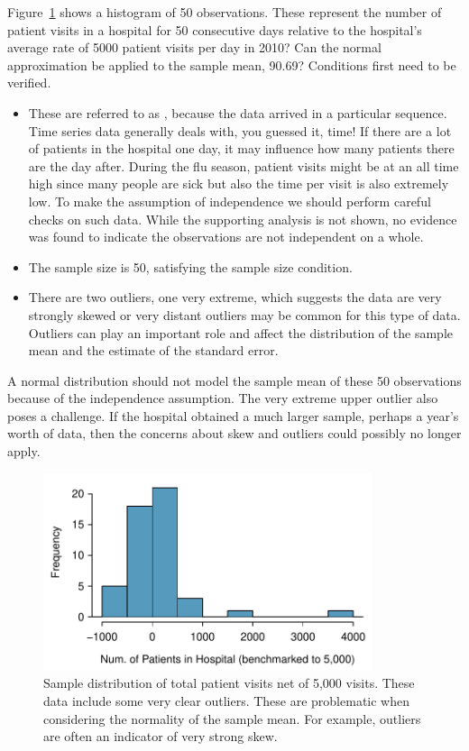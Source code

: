 \begin{example}{Figure~\ref{hospitalCanApplyNormalToSampMean} shows a histogram of 50 observations. These represent the number of patient visits in a hospital for 50 consecutive days relative to the hospital's average rate of 5000 patient visits per day in 2010? Can the normal approximation be applied to the sample mean, 90.69?}
Conditions first need to be verified. 
\begin{itemize}
\setlength{\itemsep}{0mm}
\item[(1)] These are referred to as , because the data arrived in a particular sequence. Time series data generally deals with, you guessed it, time! If there are a lot of patients in the hospital one day, it may influence how many patients there are the day after. During the flu season, patient visits might be at an all time high since many people are sick but also the time per visit is also extremely low. To make the assumption of independence we should perform careful checks on such data. While the supporting analysis is not shown, no evidence was found to indicate the observations are not independent on a whole.
\item[(2)] The sample size is 50, satisfying the sample size condition.
\item[(3)] There are two outliers, one very extreme, which suggests the data are very strongly skewed or very distant outliers may be common for this type of data. Outliers can play an important role and affect the distribution of the sample mean and the estimate of the standard error.
\end{itemize}
A normal distribution should not model the sample mean of these 50 observations because of the independence assumption. The very extreme upper outlier also poses a challenge. If the hospital obtained a much larger sample, perhaps a year's worth of data, then the concerns about skew and outliers could possibly no longer apply. \end{example}

\begin{figure}[ht]
   \centering
   \includegraphics[height=58mm]{ch_inference_foundations_oi_biostat/figures/hospitalCanApplyNormalToSampMean/hospitalCanApplyNormalToSampMean}
   \caption{Sample distribution of total patient visits net of 5,000 visits. These data include some very clear outliers. These are problematic when considering the normality of the sample mean. For example, outliers are often an indicator of very strong skew.}
   \label{hospitalCanApplyNormalToSampMean}
\end{figure}

